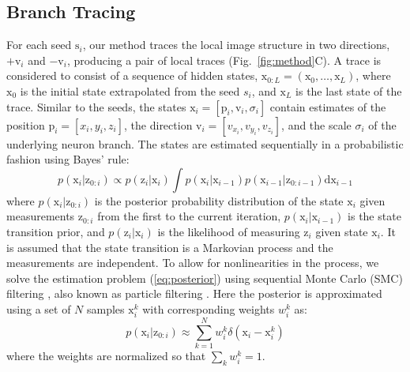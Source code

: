 \subsection{Branch Tracing}
\label{subsec:branch-tracing}
For each seed $\mathrm{s}_i$, our method traces the local image structure in two directions, $+\mathrm{v}_i$ and $-\mathrm{v}_i$, producing a pair of local traces (Fig.~\ref{fig:method}C). A trace is considered to consist of a sequence of hidden states, $\mathrm{x}_{0:L} = (\mathrm{x}_0,\dots,\mathrm{x}_L)$, where $\mathrm{x}_0$ is the initial state extrapolated from the seed $s_i$, and $\mathrm{x}_L$ is the last state of the trace. Similar to the seeds, the states $\mathrm{x}_i = \left[ \mathrm{p}_i, \mathrm{v}_i, \sigma_i \right]$ contain estimates of the position $\mathrm{p}_i = \left[ x_i, y_i, z_i  \right]$, the direction $\mathrm{v}_i = \left[ v_{x_i}, v_{y_i}, v_{z_i} \right]$, and the scale $\sigma_i$ of the underlying neuron branch. The states are estimated sequentially in a probabilistic fashion using Bayes' rule:
\begin{equation}
p(\mathrm{x}_i | \mathrm{z}_{0:i}) \propto  p(\mathrm{z}_i | \mathrm{x}_i) \!\!\int\!\! p(\mathrm{x}_i | \mathrm{x}_{i-1}) p(\mathrm{x}_{i-1} | \mathrm{z}_{0:i-1}) \mathrm{dx}_{i-1}
\label{eq:posterior}
\end{equation}
where $p(\mathrm{x}_i | \mathrm{z}_{0:i})$ is the posterior probability distribution of the state $\mathrm{x}_i$ given measurements $\mathrm{z}_{0:i}$ from the first to the current iteration, $p(\mathrm{x}_i | \mathrm{x}_{i-1})$ is the state transition prior, and $p(\mathrm{z}_i | \mathrm{x}_i)$ is the likelihood of measuring $\mathrm{z}_i$ given state $\mathrm{x}_i$. It is assumed that the state transition is a Markovian process and the measurements are independent. To allow for nonlinearities in the process, we solve the estimation problem (\ref{eq:posterior}) using sequential Monte Carlo (SMC) filtering \cite{doucet2001introduction}, also known as particle filtering \cite{arulampalam2002tutorial}. Here the posterior is approximated using a set of $N$ samples $\mathrm{x}_{i}^k$ with corresponding weights $w_i^k$ as:
\begin{equation}
p(\mathrm{x}_i | \mathrm{z}_{0:i}) \approx \sum_{k=1}^{N} w_i^k \delta(\mathrm{x}_i - \mathrm{x}_i^k)
\label{eq:approx}
\end{equation}
where the weights are normalized so that $\sum_k w_i^k = 1$.

